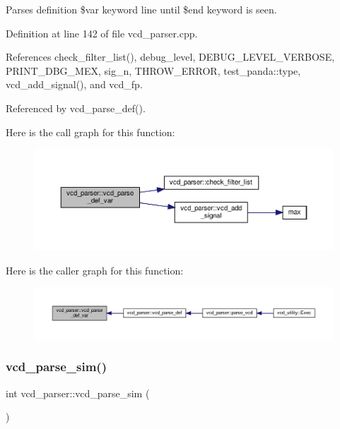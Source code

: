 Parses definition \$var keyword line until \$end keyword is seen. 



Definition at line 142 of file vcd\+\_\+parser.\+cpp.



References check\+\_\+filter\+\_\+list(), debug\+\_\+level, D\+E\+B\+U\+G\+\_\+\+L\+E\+V\+E\+L\+\_\+\+V\+E\+R\+B\+O\+SE, P\+R\+I\+N\+T\+\_\+\+D\+B\+G\+\_\+\+M\+EX, sig\+\_\+n, T\+H\+R\+O\+W\+\_\+\+E\+R\+R\+OR, test\+\_\+panda\+::type, vcd\+\_\+add\+\_\+signal(), and vcd\+\_\+fp.



Referenced by vcd\+\_\+parse\+\_\+def().

Here is the call graph for this function\+:
\nopagebreak
\begin{figure}[H]
\begin{center}
\leavevmode
\includegraphics[width=350pt]{d2/d25/classvcd__parser_add86b6565edba7e85a6508594798f56a_cgraph}
\end{center}
\end{figure}
Here is the caller graph for this function\+:
\nopagebreak
\begin{figure}[H]
\begin{center}
\leavevmode
\includegraphics[width=350pt]{d2/d25/classvcd__parser_add86b6565edba7e85a6508594798f56a_icgraph}
\end{center}
\end{figure}
\mbox{\label{classvcd__parser_a591daeaca11ad1bea3fd9a3c5c4b99de}} 
\subsubsection{\texorpdfstring{vcd\+\_\+parse\+\_\+sim()}{vcd\_parse\_sim()}}
{\footnotesize\ttfamily int vcd\+\_\+parser\+::vcd\+\_\+parse\+\_\+sim (\begin{DoxyParamCaption}{ }\end{DoxyParamCaption})\hspace{0.3cm}{\ttfamily [private]}}



